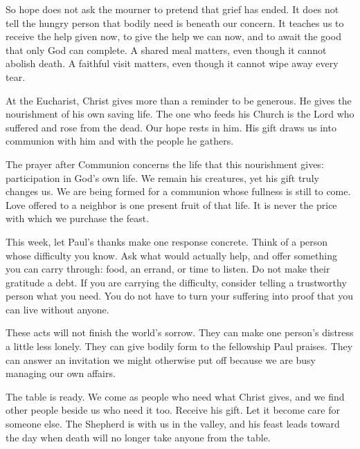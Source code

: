 So hope does not ask the mourner to pretend that grief has ended. It does not tell the hungry person that bodily need is beneath our concern. It teaches us to receive the help given now, to give the help we can now, and to await the good that only God can complete. A shared meal matters, even though it cannot abolish death. A faithful visit matters, even though it cannot wipe away every tear.

At the Eucharist, Christ gives more than a reminder to be generous. He gives the nourishment of his own saving life. The one who feeds his Church is the Lord who suffered and rose from the dead. Our hope rests in him. His gift draws us into communion with him and with the people he gathers.

The prayer after Communion concerns the life that this nourishment gives: participation in God's own life. We remain his creatures, yet his gift truly changes us. We are being formed for a communion whose fullness is still to come. Love offered to a neighbor is one present fruit of that life. It is never the price with which we purchase the feast.

This week, let Paul's thanks make one response concrete. Think of a person whose difficulty you know. Ask what would actually help, and offer something you can carry through: food, an errand, or time to listen. Do not make their gratitude a debt. If you are carrying the difficulty, consider telling a trustworthy person what you need. You do not have to turn your suffering into proof that you can live without anyone.

These acts will not finish the world's sorrow. They can make one person's distress a little less lonely. They can give bodily form to the fellowship Paul praises. They can answer an invitation we might otherwise put off because we are busy managing our own affairs.

The table is ready. We come as people who need what Christ gives, and we find other people beside us who need it too. Receive his gift. Let it become care for someone else. The Shepherd is with us in the valley, and his feast leads toward the day when death will no longer take anyone from the table.
